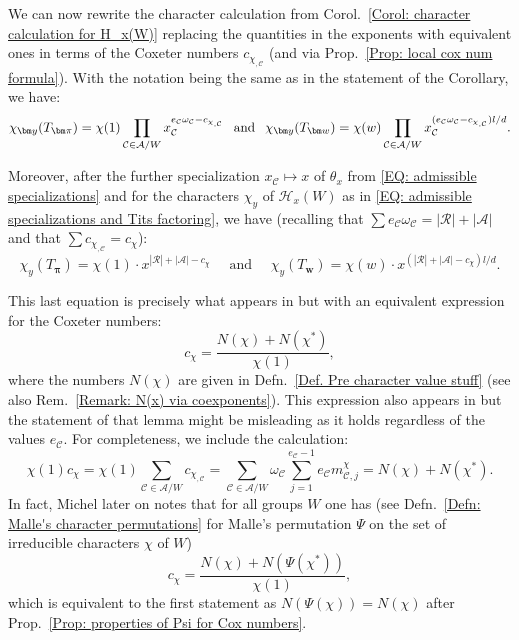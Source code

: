 We can now rewrite the character calculation from Corol.~\ref{Corol: character calculation for H_x(W)} replacing the quantities in the exponents with equivalent ones in terms of the Coxeter numbers $c_{\chi_{,\mathcal{C}}}$ (and via Prop.~\ref{Prop: local cox num formula}). With the notation being the same as in the statement of the Corollary, we have: \begin{equation}
\chi_{\bm y}(T_{\bm \pi})=\chi(1)\prod_{\mathcal{C}\in\mathcal{A}/W}x_{\mathcal{C}}^{e_{\mathcal{C}}\omega_{\mathcal{C}}-c_{\chi_{,\mathcal{C}}}}\hspace{1.5mm}\text{ and }\hspace{1.5mm}\chi_{\bm y}(T_{\bm w})=\chi(w)\prod_{\mathcal{C}\in\mathcal{A}/W}x_{\mathcal{C}}^{(e_{\mathcal{C}}\omega_{\mathcal{C}}-c_{\chi_{,\mathcal{C}}})l/d}.\label{EQ: character values via local Coxeter}\end{equation}

Moreover, after the further specialization $x_{\mathcal{C}}\mapsto x$ of $\theta_x$ from \eqref{EQ: admissible specializations} and for the characters $\chi_y$ of $\mathcal{H}_x(W)$ as in \eqref{EQ: admissible specializations and Tits factoring}, we have (recalling that $\sum e_{\mathcal{C}}\omega_{\mathcal{C}}=|\mathcal{R}|+|\mathcal{A}|$ and that $\sum c_{\chi_{,\mathcal{C}}}=c_{\chi}$):
\begin{equation}
\chi_y(T_{\bm \pi})=\chi(1)\cdot x^{|\mathcal{R}|+|\mathcal{A}|-c_{\chi}}\quad\text{ and }\quad\chi_y(T_{\bm w})=\chi(w)\cdot x^{(|\mathcal{R}|+|\mathcal{A}|-c_{\chi})l/d}.\label{EQ: character values via Coxeter-not local}\end{equation}


\begin{rema}\label{Remark: cox numbers and N(x)+N(x*)}
This last equation is precisely what appears in \cite[Prop.~4.18]{broue-michel-french-paper} but with an equivalent expression for the Coxeter numbers: $$c_{\chi}=\dfrac{N(\chi)+N(\chi^*)}{\chi(1)},$$ where the numbers $N(\chi)$ are given in Defn.~\ref{Def. Pre character value stuff} (see also Rem.~\ref{Remark: N(x) via coexponents}). This expression also appears in \cite[Lemma~1]{michel-deligne-lusztig-derivation} but the statement of that lemma might be misleading as it holds regardless of the values $e_{\mathcal{C}}$. For completeness, we include the calculation: $$\chi(1)c_{\chi}=\chi(1)\sum_{\mathcal{C}\in\mathcal{A}/W}c_{\chi_{,\mathcal{C}}}=\sum_{\mathcal{C}\in\mathcal{A}/W}\omega_{\mathcal{C}}\sum_{j=1}^{e_{\mathcal{C}}-1}e_{\mathcal{C}}m^{\chi}_{\mathcal{C},j}=N(\chi)+N(\chi^*).$$
In fact, Michel later on \cite[Rem.~2]{michel-deligne-lusztig-derivation} notes that for all groups $W$ one has (see Defn.~\ref{Defn: Malle's character permutations} for Malle's permutation $\Psi$ on the set of irreducible characters $\chi$ of $W$) $$c_{\chi}=\dfrac{N(\chi)+N(\Psi(\chi^*))}{\chi(1)},$$ which is equivalent to the first statement as $N(\Psi(\chi))=N(\chi)$ after Prop.~\ref{Prop: properties of Psi for Cox numbers}.
\end{rema}

